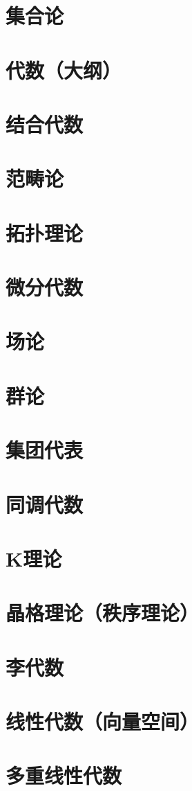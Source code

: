 \section{集合论}
\section{代数（大纲）}
\section{结合代数}
\section{范畴论}
\section{拓扑理论}
\section{微分代数}
\section{场论}
\section{群论}
\section{集团代表}
\section{同调代数}
\section{K理论}
\section{晶格理论（秩序理论）}
\section{李代数}
\section{线性代数（向量空间）}
\section{多重线性代数}

